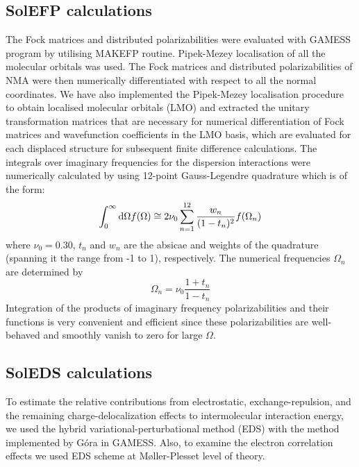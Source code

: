\documentclass[a4paper,titlepage,twoside,fleqn,12pt]{book}
\begin{document}
\begin{appendices}
\begin{refsection}
\subsection{SolEFP calculations}

The Fock matrices and distributed polarizabilities were
evaluated with GAMESS program by utilising MAKEFP routine. \citep{GAMESS.JCC.1993}
Pipek\hyp{}Mezey localisation \citep{Pipek.Mezey.JCP.1989}
of all the molecular orbitals was
used. The Fock matrices and distributed polarizabilities of
NMA were then numerically differentiated with respect to all
the normal coordinates. We have also implemented the Pipek\hyp{}Mezey 
localisation procedure to obtain localised molecular
orbitals (LMO) and extracted the unitary transformation matrices
that are necessary for numerical differentiation of Fock
matrices and wavefunction coefficients in the LMO basis,
which are evaluated for each displaced structure for subsequent
finite difference calculations. 
The integrals over
imaginary frequencies for the dispersion interactions were
numerically calculated by using 12\hyp{}point Gauss\hyp{}Legendre
quadrature which is of the form: \citep{Adamovic.Gordon.MolPhys.2005}
%
\begin{equation}
 \int_0^\infty {\rm d}\Omega f(\Omega) \cong 2\nu_0\sum_{n=1}^{12} \frac{w_n}{(1-t_n)^2}f(\Omega_n)
\end{equation}
%
where $\nu_0=0.30$, $t_n$ and $w_n$ are the
absicae and weights of the quadrature (spanning it the
range from -1 to 1), respectively. 
The numerical
frequencies $\Omega_n$ are determined by 
%
\begin{equation}
 \Omega_n = \nu_0 \frac{1+t_n}{1-t_n}
\end{equation}
% 
Integration of the products of imaginary frequency
polarizabilities and their functions is very convenient
and efficient since
these polarizabilities are well\hyp{}behaved and
smoothly vanish to zero for large $\Omega$.

\subsection{SolEDS calculations}

To estimate the relative contributions from electrostatic,
exchange\hyp{}repulsion, and the remaining charge\hyp{}delocalization
effects to intermolecular interaction energy, we
used the hybrid variational\hyp{}perturbational method (EDS) \citep{Sokalski.Roszak.Pecul.CPL.1988,
Chalasinski.Szczesniak.MolPhys.1988,Cybulski.Chalasinski.Moszynski.JCP.1990,
Gora.Bartkowiak.Roszak.Leszczynski.JCP.2004} 
with the
method implemented by G{\'o}ra \citep{Gora.EDS.1998-2010} 
in GAMESS. \citep{GAMESS.JCC.1993} 
Also, to examine the electron correlation effects 
we used EDS scheme at M{\o}ller\hyp{}Plesset level of theory.


\end{refsection}
\end{appendices}
\end{document}
